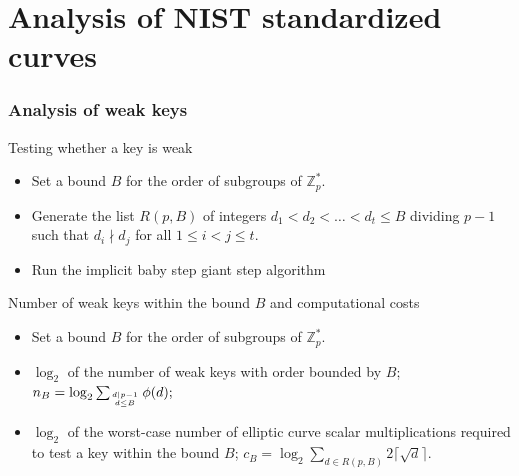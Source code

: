 \documentclass[
	11pt, %
]{beamer}
\newcommand{\Z}{\mathbb{Z}}
\newcommand{\Zpstar}{\Z_p^*}
\theoremstyle{definition}
\theoremstyle{remark}
\begin{document}
\section{Analysis of NIST standardized curves}
\begin{frame}
	\frametitle{Analysis of weak keys}
	\begin{block}{Testing whether a key is weak}
	\begin{itemize}
		\item Set a	bound $B$ for the order of subgroups of $\Zpstar$.
		\item Generate the list $R(p,B)$ of integers $d_1<d_2<\dots<d_t\leq B$ dividing $p-1$ such that $d_i\nmid d_j$ for all $1\leq i<j\leq t$. 
		\item Run the implicit baby step giant step algorithm
	\end{itemize}
\end{block}
	\begin{block}{Number of weak keys within the bound $B$ and computational costs}
	\begin{itemize}
		\item Set a	bound $B$ for the order of subgroups of $\Zpstar$.
		\item $\log_2$ of the number of weak keys with order bounded by $B$; $n_B=\log_2\sum_{d|p-1\atop d\leq B}\phi(d);$
		\item $\log_2$ of the worst-case number of elliptic curve scalar multiplications required to test a key within the bound $B$; $c_B=\log_2\sum_{d\in R(p,B)}2\lceil\sqrt{d}\rceil.$
	\end{itemize}
\end{block}

\end{frame}

\end{document}

